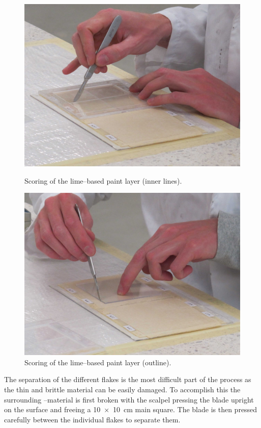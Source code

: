 \documentclass[review]{elsarticle}
\begin{document}
\begin{figure}[htb]
  \centering
  \begin{minipage}[t]{0.48\textwidth}
  \includegraphics[width=\textwidth]{scoring_01}
  \caption{Scoring of the lime--based paint layer (inner lines).}
  \label{fig:scoring_01}
  \end{minipage}
  \hfill
  \begin{minipage}[t]{0.48\textwidth}
  \includegraphics[width=\textwidth]{scoring_02}
  \caption{Scoring of the lime--based paint layer (outline).}
  \label{fig:scoring_02}
  \end{minipage}
\end{figure}

The separation of the different flakes is the most difficult part of the process as the thin and brittle material can be easily damaged.
To accomplish this the surrounding --material is first broken with the scalpel pressing the blade upright on the surface and freeing a \SI[product-units = single]{10 x 10}{\cm} main square.
The blade is then pressed carefully between the individual flakes to separate them.

\printglossary
\end{document}
